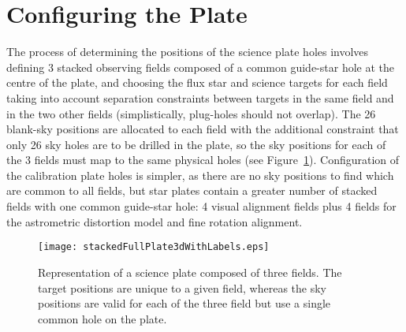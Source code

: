 \documentclass[11pt,twoside]{article}
\begin{document}
\section{Configuring the Plate}
The process of determining the positions of the science plate holes
involves defining 3 stacked observing fields composed of a common
guide-star hole at the centre of the plate, and choosing the flux star
and science targets for each field taking into account separation
constraints between targets in the same field and in the two other
fields (simplistically, plug-holes should not overlap). The 26
blank-sky positions are allocated to each field with the additional
constraint that only 26 sky holes are to be drilled in the plate, so
the sky positions for each of the 3 fields must map to the same
physical holes (see Figure~\ref{p048_FigStackedFields}).
%
Configuration of the calibration plate holes is simpler, as there are
no sky positions to find which are common to all fields, but star
plates contain a greater number of stacked fields with one common
guide-star hole: 4 visual alignment fields plus 4 fields for the
astrometric distortion model and fine rotation alignment.

\begin{figure}[!t]
\centering
\texttt{[image: stackedFullPlate3dWithLabels.eps]}
\caption {Representation of a science plate composed of three fields. The target
positions are unique to a given field, whereas the sky positions are
valid for each of the three field but use a single common hole on the plate.}
\label {p048_FigStackedFields}
\end{figure}
\end{document}
